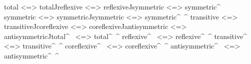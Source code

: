 \begin{code}
total            <=>  total^^
reflexive        <=>  reflexive^^
symmetric        <=>  symmetric^~
symmetric        <=>  symmetric^^
symmetric        <=>  symmetric^~^
transitive       <=>  transitive^^
coreflexive      <=>  coreflexive^^
antisymmetric    <=>  antisymmetric^^
total^~          <=>  total^~^
reflexive^~      <=>  reflexive^~^
transitive^~     <=>  transitive^~^
coreflexive^~    <=>  coreflexive^~^
antisymmetric^~  <=>  antisymmetric^~^
\end{code}
